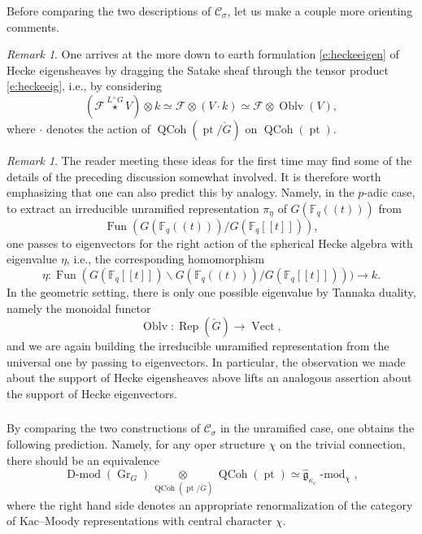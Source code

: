 \documentclass[10pt]{amsart}
\newcommand{\pt}{\on{pt}}
\newcommand{\fgc}{\widehat{\fg}_{\kappa_c}}
\newcommand{\Fqt}{\Fq(\!(t)\!)}
\newcommand{\fg}{\mathfrak{g}}
\newcommand{\on}{\operatorname}
\renewcommand{\mod}{\on{-mod}}
\newcommand{\Dmod}{\on{D-mod}}
\newcommand{\Fq}{\mathbb{F}_q}
\newcommand{\Fun}{\on{Fun}}
\newcommand{\Vect}{\on{Vect}}
\theoremstyle{remark}
\newtheorem{re}[subsubsection]{Remark}
\newcommand{\Gr}{\operatorname{Gr}}
\newcommand{\sF}{\mathscr{F}}
\numberwithin{equation}{section}
\newcommand{\cG}{\check{G}}
\newcommand{\sC}{\mathscr{C}}
\renewcommand{\mod}{\operatorname{-mod}}
\newcommand{\QCoh}{\on{QCoh}}
\begin{document}
Before comparing the two descriptions of $\sC_\sigma$, let us make a couple 
more orienting comments. 

\begin{re}  One arrives at the more down to earth formulation \eqref{e:heckeeigen} of Hecke eigensheaves 
by dragging the Satake 
sheaf 
through 
the tensor product \eqref{e:heckeeig}, i.e., by considering 
%
\[
     (\sF \overset {L^+G} \star V) \otimes k \simeq \sF \otimes (V \cdot k) 
     \simeq 
     \sF \otimes \on{Oblv}(V), 
\]
%	 
where $\cdot$ denotes the action of $\QCoh(\pt/\cG)$ on $\QCoh(\pt)$. 
	\end{re}
	
	
	\begin{re}The reader meeting these ideas for the first time may find some 
	of the details of the preceding discussion somewhat involved. It is therefore worth emphasizing 
	that one can also predict this by analogy. Namely, in the $p$-adic case, to 
	extract an irreducible unramified representation $\pi_{\eta}$ of $G(\Fqt)$ 
	from 
	\[
	  \Fun( G(\Fqt)/G(\Fq[[t]])),
	\]
	one passes to eigenvectors for the right action of the spherical Hecke 
	algebra with eigenvalue $\eta$, i.e., the corresponding homomorphism
	\[   \eta: \Fun(G(\Fq[[t]]) \backslash G(\Fqt)/G(\Fq[[t]]))) \rightarrow k.\]
	 In the geometric setting, there is only one possible eigenvalue by Tannaka 
	 duality,  namely the
	 monoidal functor
	 \[ \on{Oblv}: \on{Rep}(\cG) \rightarrow \Vect,\]
	  and we are again building the irreducible unramified 
	  representation from the universal one by passing to eigenvectors. In particular, the observation we made about the support of Hecke eigensheaves above lifts an analogous assertion about the support of Hecke eigenvectors. 
	\end{re}
	

	
	
	
	
	\subsubsection{} By comparing the two constructions of $\sC_{\sigma}$ in 
	the unramified case, one obtains the following prediction. Namely, for any 
	oper structure $\chi$ on the trivial connection, there should be an 
	equivalence
	\begin{equation} \label{e:locaff}
	      \Dmod(\Gr_G) \underset {\QCoh(\pt / \cG)} \otimes \QCoh(\pt) \simeq 
	      \fgc\mod_\chi,
	\end{equation}
	where the right hand side denotes an appropriate renormalization of the 
	category of Kac--Moody representations with central character $\chi$. 
	
\end{document}
